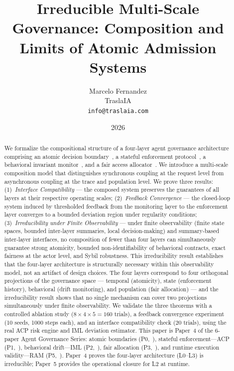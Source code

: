 \documentclass[11pt]{article}
\begin{document}
\title{\textbf{Irreducible Multi-Scale Governance: Composition and\\
Limits of Atomic Admission Systems}}

\author{Marcelo Fernandez \\
TraslaIA \\
\texttt{info@traslaia.com}}

\date{2026}
\maketitle

\begin{abstract}
We formalize the compositional structure of a four-layer agent governance
architecture comprising an atomic decision boundary~\cite{fernandez2026a},
a stateful enforcement protocol~\cite{fernandez2026b}, a behavioral invariant
monitor~\cite{fernandez2026c}, and a fair access allocator~\cite{fairgov26}.
We introduce a multi-scale composition model that distinguishes synchronous
coupling at the request level from asynchronous coupling at the trace and
population level. We prove three results: (1)~\emph{Interface Compatibility}
--- the composed system preserves the guarantees of all layers at their
respective operating scales; (2)~\emph{Feedback Convergence} --- the
closed-loop system induced by thresholded feedback from the monitoring layer
to the enforcement layer converges to a bounded deviation region under
regularity conditions; (3)~\emph{Irreducibility under Finite Observability}
--- under finite observability (finite state spaces, bounded inter-layer
summaries, local decision-making) and summary-based inter-layer interfaces,
no composition of fewer than four layers can simultaneously guarantee
strong atomicity, bounded non-identifiability of behavioral contracts, exact
fairness at the actor level, and Sybil robustness.
This irreducibility result establishes that the
four-layer architecture is structurally necessary within this observability
model, not an artifact of design
choices. The four layers correspond to four orthogonal projections of the
governance space --- temporal (atomicity), state (enforcement history),
behavioral (drift monitoring), and population (fair allocation) --- and
the irreducibility result shows that no single mechanism can cover two
projections simultaneously under finite observability.
We validate the three theorems with a controlled ablation study
($8 \times 4 \times 5 = 160$ trials), a feedback convergence experiment
(10 seeds, 1000 steps each), and an interface compatibility check (20 trials),
using the real ACP risk engine and IML deviation estimator.
This paper is Paper~4 of the 6-paper Agent Governance Series:
atomic boundaries (P0,~\cite{fernandez2026a}),
stateful enforcement---ACP (P1,~\cite{fernandez2026b}),
behavioral drift---IML (P2,~\cite{fernandez2026c}),
fair allocation (P3,~\cite{fairgov26}),
and runtime execution validity---RAM (P5,~\cite{fernandez2026ram}).
Paper~4 proves the four-layer architecture (L0--L3) is irreducible;
Paper~5 provides the operational closure for L2 at runtime.
\end{abstract}
\end{document}
